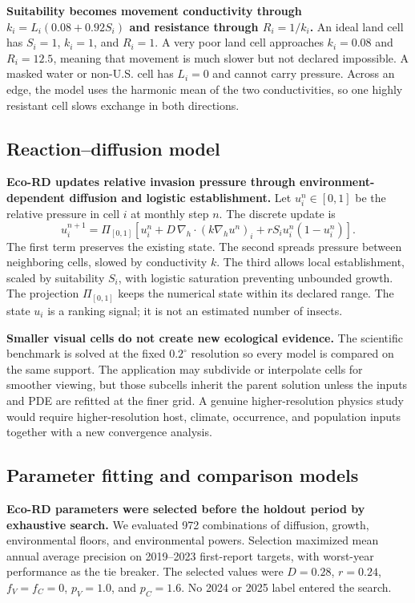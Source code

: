 \documentclass{article}
\begin{document}
\textbf{Suitability becomes movement conductivity through $k_i=L_i(0.08+0.92S_i)$ and resistance through $R_i=1/k_i$.} An ideal land cell has $S_i=1$, $k_i=1$, and $R_i=1$. A very poor land cell approaches $k_i=0.08$ and $R_i=12.5$, meaning that movement is much slower but not declared impossible. A masked water or non-U.S. cell has $L_i=0$ and cannot carry pressure. Across an edge, the model uses the harmonic mean of the two conductivities, so one highly resistant cell slows exchange in both directions.

\subsection{Reaction--diffusion model}

\textbf{Eco-RD updates relative invasion pressure through environment-dependent diffusion and logistic establishment.} Let $u_i^n\in[0,1]$ be the relative pressure in cell $i$ at monthly step $n$. The discrete update is
\begin{equation}
u_i^{n+1}=\Pi_{[0,1]}\left[
u_i^n+D\,\nabla_h\!\cdot(k\nabla_h u^n)_i
+rS_i u_i^n(1-u_i^n)
\right].
\end{equation}
The first term preserves the existing state. The second spreads pressure between neighboring cells, slowed by conductivity $k$. The third allows local establishment, scaled by suitability $S_i$, with logistic saturation preventing unbounded growth. The projection $\Pi_{[0,1]}$ keeps the numerical state within its declared range. The state $u_i$ is a ranking signal; it is not an estimated number of insects.

\textbf{Smaller visual cells do not create new ecological evidence.} The scientific benchmark is solved at the fixed $0.2^\circ$ resolution so every model is compared on the same support. The application may subdivide or interpolate cells for smoother viewing, but those subcells inherit the parent solution unless the inputs and PDE are refitted at the finer grid. A genuine higher-resolution physics study would require higher-resolution host, climate, occurrence, and population inputs together with a new convergence analysis.

\subsection{Parameter fitting and comparison models}

\textbf{Eco-RD parameters were selected before the holdout period by exhaustive search.} We evaluated 972 combinations of diffusion, growth, environmental floors, and environmental powers. Selection maximized mean annual average precision on 2019--2023 first-report targets, with worst-year performance as the tie breaker. The selected values were $D=0.28$, $r=0.24$, $f_V=f_C=0$, $p_V=1.0$, and $p_C=1.6$. No 2024 or 2025 label entered the search.
\end{document}
